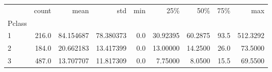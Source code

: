 \begin{tabular}{lrrrrrrrr}
\toprule
{} &  count &       mean &        std &  min &       25\% &      50\% &   75\% &       max \\
Pclass &        &            &            &      &           &          &       &           \\
\midrule
1      &  216.0 &  84.154687 &  78.380373 &  0.0 &  30.92395 &  60.2875 &  93.5 &  512.3292 \\
2      &  184.0 &  20.662183 &  13.417399 &  0.0 &  13.00000 &  14.2500 &  26.0 &   73.5000 \\
3      &  487.0 &  13.707707 &  11.817309 &  0.0 &   7.75000 &   8.0500 &  15.5 &   69.5500 \\
\bottomrule
\end{tabular}
